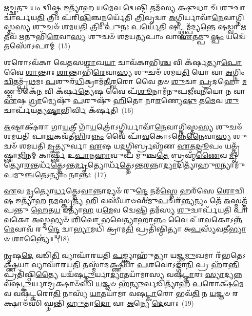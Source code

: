 \-\ul{𑌋}\-\-\ul{𑌚𑍍𑌛}\-\-\ul{𑌤𑍁} 𑌯𑌂 \ul{𑌦𑍍𑌵𑌿}\-𑌷𑍍𑌮 𑌇𑌤𑍍𑌯𑌾᳴\-\ul{𑌹} 𑌯\-\ul{𑌮𑍇}\-𑌵 𑌦𑍍𑌵𑍇\-\ul{𑌷𑍍𑌟𑌿} 𑌤𑌮᳴𑌸𑍍𑌯 \ul{𑌕𑍍𑌷𑍁}\-𑌧𑌾 𑌚᳴ \ul{𑌶𑍁}\-𑌚𑌾 𑌚𑌾॑𑌰𑍍𑌪𑌯\-\ul{𑌤𑌿} 𑌤𑍍𑌰𑌿𑌃 𑌪᳴𑌰𑌿\-\ul{𑌷𑌿}\-𑌞𑍍𑌚𑌨𑍍𑌪𑌰𑍍𑌯𑍇᳴𑌤𑌿 \ul{𑌤𑍍𑌰𑌿}\-𑌵𑍃𑌦𑍍𑌵𑌾 \ul{𑌅}\-𑌗𑍍𑌨𑌿𑌰𑍍𑌯𑌾𑌵𑌾᳴\-\ul{𑌨𑍇}\-𑌵𑌾𑌗𑍍𑌨𑌿𑌸𑍍𑌤\-\ul{𑌸𑍍𑌯} 𑌶𑍁𑌚𑍞᳴ 𑌶𑌮𑌯\-\ul{𑌤𑌿} 𑌤𑍍𑌰𑌿𑌃 𑌪𑍁\-\ul{𑌨𑌃} 𑌪𑌰𑍍𑌯𑍇᳴\-\ul{𑌤𑌿} 𑌷𑌟𑍍𑌥𑍍𑌸𑌮𑍍𑌪᳴𑌦𑍍𑌯\-\ul{𑌨𑍍𑌤𑍇} 𑌷𑌡𑍍𑌵𑌾 \ul{𑌋}\-𑌤𑌵᳴ \ul{𑌋}\-𑌤𑍁𑌭𑌿᳴\-\ul{𑌰𑍇}\-𑌵𑌾\-\ul{𑌸𑍍𑌯} 𑌶𑍁𑌚𑍞᳴ 𑌶𑌮𑌯\-\ul{𑌤𑍍𑌯}\-𑌪𑌾𑌂 𑌵𑌾 \ul{𑌏}\-𑌤𑌤𑍍𑌪𑍁\-\ul{𑌷𑍍𑌪𑌂} 𑌯𑌦𑍍𑌵𑍇᳴\-\ul{𑌤}\-𑌸𑍋᳴\-𑌽𑌪𑌾𑌮𑍍~(15)

𑌶𑌰𑍋\-𑌽𑌵᳴𑌕𑌾 𑌵𑍇𑌤𑌸\-\ul{𑌶𑌾}\-𑌖\-\ul{𑌯𑌾} 𑌚𑌾𑌵᳴𑌕𑌾𑌭𑌿\-\ul{𑌶𑍍𑌚} 𑌵𑌿 𑌕᳴𑌰𑍍\mbox{}\-\ul{𑌷}\-𑌤𑍍𑌯𑌾\-\ul{𑌪𑍋} 𑌵𑍈 \ul{𑌶𑌾}\-𑌨𑍍𑌤𑌾𑌃 \ul{𑌶𑌾}\-𑌨𑍍𑌤𑌾𑌭𑌿᳴\-\ul{𑌰𑍇}\-𑌵𑌾\-\ul{𑌸𑍍𑌯} 𑌶𑍁𑌚𑍞᳴ 𑌶𑌮𑌯\-\ul{𑌤𑌿} 𑌯𑍋 𑌵𑌾 \ul{𑌅}\-𑌗𑍍𑌨𑌿𑌂 \ul{𑌚𑌿}\-𑌤𑌮𑍍𑌪𑍍𑌰᳴\-\ul{𑌥}\-𑌮𑌃 \ul{𑌪}\-𑌶𑍁𑌰᳴\-\ul{𑌧𑌿}\-𑌕𑍍𑌰𑌾𑌮᳴𑌤𑍀\-\ul{𑌶𑍍𑌵}\-𑌰𑍋 𑌵𑍈 𑌤𑍞 \ul{𑌶𑍁}\-𑌚𑌾 \ul{𑌪𑍍𑌰}\-𑌦𑌹𑍋 \ul{𑌮}\-𑌣𑍍𑌡𑍂𑌕𑍇᳴\-\ul{𑌨} 𑌵𑌿 𑌕᳴𑌰𑍍\mbox{}𑌷\-\ul{𑌤𑍍𑌯𑍇}\-𑌷 𑌵𑍈 𑌪᳴\-\ul{𑌶𑍂}\-𑌨𑌾𑌮᳴𑌨𑍁𑌪𑌜𑍀𑌵\-\ul{𑌨𑍀}\-𑌯𑍋 𑌨 𑌵𑌾 \ul{𑌏}\-𑌷 \ul{𑌗𑍍𑌰𑌾}\-𑌮𑍍𑌯𑍇𑌷𑍁᳴ \ul{𑌪}\-𑌶𑍁𑌷𑍁᳴ \ul{𑌹𑌿}\-𑌤𑍋 𑌨𑌾\-\ul{𑌰}\-𑌣𑍍𑌯𑍇\-\ul{𑌷𑍁} 𑌤\-\ul{𑌮𑍇}\-𑌵 \ul{𑌶𑍁}\-𑌚𑌾𑌰𑍍𑌪᳴𑌯𑌤𑍍𑌯\-\ul{𑌷𑍍𑌟𑌾}\-𑌭𑌿𑌰𑍍𑌵𑌿 𑌕᳴𑌰𑍍\mbox{}𑌷𑌤𑌿~(16)

\-\ul{𑌅}\-𑌷𑍍𑌟𑌾𑌕𑍍𑌷᳴𑌰𑌾 𑌗𑌾\-\ul{𑌯}\-𑌤𑍍𑌰𑍀 𑌗𑌾᳴\-\ul{𑌯}\-𑌤𑍍𑌰𑍋॑\-𑌽𑌗𑍍𑌨𑌿𑌰𑍍𑌯𑌾𑌵𑌾᳴\-\ul{𑌨𑍇}\-𑌵𑌾𑌗𑍍𑌨𑌿𑌸𑍍𑌤\-\ul{𑌸𑍍𑌯} 𑌶𑍁𑌚𑍞᳴ 𑌶𑌮𑌯𑌤𑌿 𑌪𑌾\-\ul{𑌵}\-𑌕𑌵᳴𑌤𑍀\-\ul{𑌭𑌿}\-𑌰\-\ul{𑌨𑍍𑌨𑌂} 𑌵𑍈 𑌪𑌾᳴\-\ul{𑌵}\-𑌕𑍋\-𑌽𑌨𑍍𑌨𑍇᳴\-\ul{𑌨𑍈}\-𑌵𑌾\-\ul{𑌸𑍍𑌯} 𑌶𑍁𑌚𑍞᳴ 𑌶𑌮𑌯𑌤𑌿 \ul{𑌮𑍃}\-𑌤𑍍𑌯𑍁𑌰𑍍𑌵𑌾 \ul{𑌏}\-𑌷 𑌯\-\ul{𑌦}\-𑌗𑍍𑌨𑌿𑌰𑍍𑌬𑍍𑌰𑌹𑍍𑌮᳴𑌣 \ul{𑌏}\-𑌤\-\ul{𑌦𑍍𑌰𑍂}\-𑌪𑌂 𑌯𑌤𑍍𑌕𑍃᳴𑌷𑍍𑌣𑌾\-\ul{𑌜𑌿}\-𑌨𑌮𑍍 𑌕𑌾𑌰𑍍\mbox{}𑌷𑍍𑌣𑍀᳴ 𑌉\-\ul{𑌪𑌾}\-𑌨\-\ul{𑌹𑌾}\-𑌵𑍁𑌪᳴ 𑌮𑍁𑌞𑍍𑌚\-\ul{𑌤𑍇} 𑌬𑍍𑌰𑌹𑍍𑌮᳴\-\ul{𑌣𑍈}\-𑌵 \ul{𑌮𑍃}\-𑌤𑍍𑌯𑍋\-\ul{𑌰}\-𑌨𑍍𑌤𑌰𑍍𑌧᳴\-\ul{𑌤𑍍𑌤𑍇}\-\-𑌽𑌨𑍍𑌤\-\ul{𑌰𑍍𑌮𑍃}\-𑌤𑍍𑌯𑍋𑌰𑍍𑌧᳴\-\ul{𑌤𑍍𑌤𑍇}\-\-𑌽𑌨𑍍𑌤\-\ul{𑌰}\-𑌨𑍍𑌨𑌾\-\ul{𑌦𑍍𑌯𑌾}\-𑌦𑌿𑌤𑍍𑌯𑌾᳴𑌹𑍁\-\ul{𑌰}\-𑌨𑍍𑌯𑌾𑌮𑍁᳴𑌪\-\ul{𑌮𑍁}\-𑌞𑍍𑌚\-\ul{𑌤𑍇}\-\-𑌽𑌨𑍍𑌯𑌾𑌂 𑌨𑌾𑌨𑍍𑌤𑌃~(17)

\-\ul{𑌏}\-𑌵 \ul{𑌮𑍃}\-𑌤𑍍𑌯𑍋\-\ul{𑌰𑍍𑌧}\-𑌤𑍍𑌤𑍇\-𑌽\-\ul{𑌵𑌾}\-𑌨𑍍𑌨𑌾𑌦𑍍𑌯𑍞᳴ 𑌰𑍁\-\ul{𑌨𑍍𑌦𑍍𑌧𑍇} 𑌨𑌮᳴\-\ul{𑌸𑍍𑌤𑍇} 𑌹𑌰᳴𑌸𑍇 \ul{𑌶𑍋}\-𑌚𑌿\-\ul{𑌷} 𑌇𑌤𑍍𑌯𑌾᳴𑌹 𑌨\-\ul{𑌮}\-𑌸𑍍𑌕𑍃\-\ul{𑌤𑍍𑌯} 𑌹𑌿 𑌵𑌸𑍀᳴𑌯𑌾𑍞𑌸𑌮𑍁\-\ul{𑌪}\-𑌚𑌰᳴\-\ul{𑌨𑍍𑌤𑍍𑌯}\-𑌨𑍍𑌯𑌂 𑌤𑍇᳴ \ul{𑌅}\-𑌸𑍍𑌮𑌤𑍍𑌤᳴𑌪𑌨𑍍𑌤𑍁 \ul{𑌹𑍇}\-𑌤\-\ul{𑌯} 𑌇𑌤𑍍𑌯𑌾᳴\-\ul{𑌹} 𑌯\-\ul{𑌮𑍇}\-𑌵 𑌦𑍍𑌵𑍇\-\ul{𑌷𑍍𑌟𑌿} 𑌤𑌮᳴𑌸𑍍𑌯 \ul{𑌶𑍁}\-𑌚𑌾𑌰𑍍𑌪᳴𑌯𑌤𑌿 𑌪𑌾\-\ul{𑌵}\-𑌕𑍋 \ul{𑌅}\-𑌸𑍍𑌮𑌭𑍍𑌯𑍞᳴ \ul{𑌶𑌿}\-𑌵𑍋 \ul{𑌭}\-𑌵𑍇\-\ul{𑌤𑍍𑌯𑌾}\-𑌹𑌾\-\ul{𑌨𑍍𑌨𑌂} 𑌵𑍈 𑌪𑌾᳴\-\ul{𑌵}\-𑌕𑍋\-𑌽𑌨𑍍𑌨᳴\-\ul{𑌮𑍇}\-𑌵𑌾𑌵᳴ 𑌰𑍁\-\ul{𑌨𑍍𑌦𑍍𑌧𑍇} 𑌦𑍍𑌵𑌾\-\ul{𑌭𑍍𑌯𑌾}\-𑌮𑌧𑌿᳴ 𑌕𑍍𑌰𑌾𑌮\-\ul{𑌤𑌿} 𑌪𑍍𑌰𑌤𑌿᳴𑌷𑍍𑌠𑌿𑌤𑍍𑌯𑌾 𑌅\-\ul{𑌪}\-𑌸𑍍𑌯᳴𑌵𑌤𑍀\-\ul{𑌭𑍍𑌯𑌾}\-\-\ul{𑍞} 𑌶𑌾𑌨𑍍𑌤𑍍𑌯𑍈॑॥~(18)

{\anuvakamend[{𑌶𑍁𑌗𑍍𑌵𑍇᳴\-\ul{𑌤}\-𑌸𑍋᳴\-𑌽𑌪𑌾𑌮᳴\-\ul{𑌷𑍍𑌟𑌾}\-𑌭𑌿𑌰𑍍𑌵𑌿𑌕᳴𑌰𑍍\mbox{}𑌷\-\ul{𑌤𑌿} 𑌨𑌾𑌨𑍍𑌤𑌰𑍇\-\ul{𑌕𑌾}\-𑌨𑍍𑌨𑌪᳴\-\ul{𑌞𑍍𑌚𑌾}\-𑌶𑌚𑍍𑌚᳴}]}%

\-\ul{𑌨𑍃}\-𑌷\-\ul{𑌦𑍇} 𑌵𑌡𑌿\-\ul{𑌤𑌿} 𑌵𑍍𑌯𑌾𑌘𑌾᳴𑌰𑌯𑌤𑌿 \ul{𑌪}\-𑌙𑍍𑌕𑍍𑌤𑍍𑌯𑌾𑌹𑍁᳴𑌤𑍍𑌯𑌾 𑌯𑌜𑍍𑌞\-\ul{𑌮𑍁}\-𑌖𑌮𑌾 𑌰᳴𑌭𑌤𑍇\-𑌽\-\ul{𑌕𑍍𑌷𑍍𑌣}\-𑌯𑌾 𑌵𑍍𑌯𑌾𑌘𑌾᳴𑌰𑌯\-\ul{𑌤𑌿} 𑌤𑌸𑍍𑌮𑌾᳴𑌦\-\ul{𑌕𑍍𑌷𑍍𑌣}\-𑌯𑌾 \ul{𑌪}\-𑌶𑌵𑍋\-𑌽𑌙𑍍𑌗𑌾᳴\-\ul{𑌨𑌿} 𑌪𑍍𑌰 𑌹᳴𑌰\-\ul{𑌨𑍍𑌤𑌿} 𑌪𑍍𑌰𑌤𑌿᳴𑌷𑍍𑌠𑌿\-\ul{𑌤𑍍𑌯𑍈} 𑌯𑌦𑍍𑌵᳴𑌷\-\ul{𑌟𑍍𑌕𑍁}\-𑌰𑍍𑌯𑌾\-\ul{𑌦𑍍𑌯𑌾}\-𑌤𑌯𑌾᳴𑌮𑌾𑌸𑍍𑌯 𑌵𑌷\-\ul{𑌟𑍍𑌕𑌾}\-𑌰𑌃 \ul{𑌸𑍍𑌯𑌾}\-𑌦𑍍𑌯𑌨𑍍𑌨 𑌵᳴𑌷\-\ul{𑌟𑍍𑌕𑍁}\-॒𑌰𑍍𑌯𑌾𑌦𑍍𑌰𑌕𑍍𑌷𑌾𑍞᳴𑌸𑌿 \ul{𑌯}\-𑌜𑍍𑌞𑍞 𑌹᳴\-\ul{𑌨𑍍𑌯𑍁}\-𑌰𑍍𑌵𑌡𑌿𑌤𑍍𑌯𑌾᳴𑌹 \ul{𑌪}\-𑌰𑍋𑌕𑍍𑌷᳴\-\ul{𑌮𑍇}\-𑌵 𑌵𑌷᳴𑌟𑍍𑌕𑌰𑍋\-\ul{𑌤𑌿} 𑌨𑌾𑌸𑍍𑌯᳴ \ul{𑌯𑌾}\-𑌤𑌯𑌾᳴𑌮𑌾 𑌵𑌷\-\ul{𑌟𑍍𑌕𑌾}\-𑌰𑍋 𑌭𑌵᳴\-\ul{𑌤𑌿} 𑌨 \ul{𑌯}\-𑌜𑍍𑌞𑍞 𑌰𑌕𑍍𑌷𑌾𑍞᳴𑌸𑌿 𑌘𑍍𑌨𑌨𑍍𑌤𑌿 \ul{𑌹𑍁}\-𑌤𑌾\-\ul{𑌦𑍋} 𑌵𑌾 \ul{𑌅}\-𑌨𑍍𑌯𑍇 \ul{𑌦𑍇}\-𑌵𑌾𑌃~(19)

